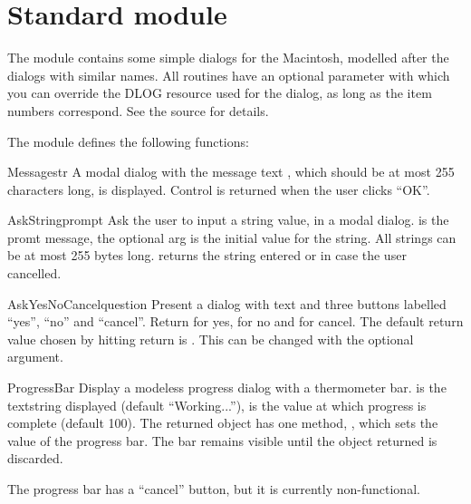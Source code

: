 \section{Standard module }
\label{module-EasyDialogs}

The  module contains some simple dialogs for
the Macintosh, modelled after the  dialogs with similar
names. All routines have an optional parameter  with which you
can override the DLOG resource used for the dialog, as long as the
item numbers correspond. See the source for details.

The  module defines the following functions:

\renewcommand{\indexsubitem}{(in module EasyDialogs)}

\begin{funcdesc}{Message}{str}
A modal dialog with the message text , which should be at
most 255 characters long, is displayed. Control is returned when the
user clicks ``OK''.
\end{funcdesc}

\begin{funcdesc}{AskString}{prompt}
Ask the user to input a string value, in a modal dialog. 
is the promt message, the optional  arg is the initial
value for the string. All strings can be at most 255 bytes
long.  returns the string entered or  in
case the user cancelled.
\end{funcdesc}

\begin{funcdesc}{AskYesNoCancel}{question}
Present a dialog with text  and three buttons labelled
``yes'', ``no'' and ``cancel''. Return  for yes,  for
no and  for cancel. The default return value chosen by
hitting return is . This can be changed with the optional
 argument.
\end{funcdesc}

\begin{funcdesc}{ProgressBar}{}
Display a modeless progress dialog with a thermometer bar. 
is the textstring displayed (default ``Working...''),  is
the value at which progress is complete (default 100). The returned
object has one method, , which sets the value of the
progress bar. The bar remains visible until the object returned is
discarded.

The progress bar has a ``cancel'' button, but it is currently
non-functional.
\end{funcdesc}


